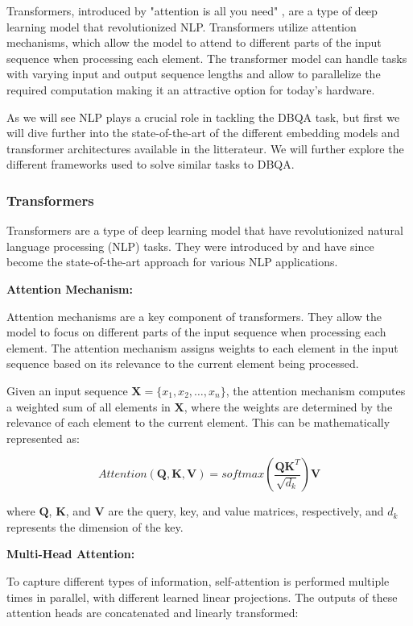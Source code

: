 \documentclass[a4paper,12pt]{article}
\begin{document}
Transformers, introduced by "attention is all you need" \cite{attention}, are a type of deep learning model that revolutionized NLP. 
Transformers utilize attention mechanisms, which allow the model to attend to different parts of the input sequence when processing each element. 
The transformer model can handle tasks with varying input and output sequence lengths and allow to parallelize the required computation making it an attractive option 
for today's hardware.

As we will see NLP plays a crucial role in tackling the DBQA task, but first we will dive further into the state-of-the-art of the different embedding models 
and transformer architectures available in the litterateur. We will further explore the different frameworks used to solve similar tasks to DBQA.

\subsubsection{Transformers}

Transformers are a type of deep learning model that have revolutionized natural language processing (NLP) tasks. 
They were introduced by \cite{attention} and have since become the state-of-the-art approach for various NLP applications.

\textbf{Attention Mechanism:}

Attention mechanisms are a key component of transformers. They allow the model to focus on different parts of the input sequence when processing each element. The attention mechanism assigns weights to each element in the input sequence based on its relevance to the current element being processed.

Given an input sequence $\mathbf{X} = \{x_1, x_2, \ldots, x_n\}$, the attention mechanism computes a weighted sum of all elements in $\mathbf{X}$, where the weights are determined by the relevance of each element to the current element. This can be mathematically represented as:

$$Attention(\mathbf{Q}, \mathbf{K}, \mathbf{V}) = softmax\left(\frac{\mathbf{QK}^T}{\sqrt{d_k}}\right) \mathbf{V}$$

where $\mathbf{Q}$, $\mathbf{K}$, and $\mathbf{V}$ are the query, key, and value matrices, respectively, and $d_k$ represents the dimension of the key.

\textbf{Multi-Head Attention:}

To capture different types of information, self-attention is performed multiple times in parallel, with different learned linear projections. The outputs of these attention heads are concatenated and linearly transformed:
\end{document}
